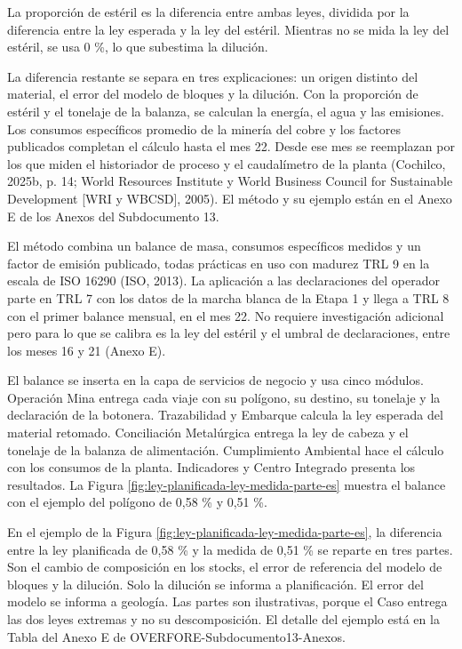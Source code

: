 \documentclass[subdoc]{../../comun/overfore}
\begin{document}
La proporción de estéril es la diferencia entre ambas leyes, dividida por la diferencia entre la ley esperada y la ley del estéril. Mientras no se mida la ley del estéril, se usa 0 \%, lo que subestima la dilución.

La diferencia restante se separa en tres explicaciones: un origen distinto del material, el error del modelo de bloques y la dilución. Con la proporción de estéril y el tonelaje de la balanza, se calculan la energía, el agua y las emisiones. Los consumos específicos promedio de la minería del cobre y los factores publicados completan el cálculo hasta el mes 22. Desde ese mes se reemplazan por los que miden el historiador de proceso y el caudalímetro de la planta (Cochilco, 2025b, p. 14; World Resources Institute y World Business Council for Sustainable Development [WRI y WBCSD], 2005). El método y su ejemplo están en el Anexo E de los Anexos del Subdocumento 13.

El método combina un balance de masa, consumos específicos medidos y un factor de emisión publicado, todas prácticas en uso con madurez TRL 9 en la escala de ISO 16290 (ISO, 2013). La aplicación a las declaraciones del operador parte en TRL 7 con los datos de la marcha blanca de la Etapa 1 y llega a TRL 8 con el primer balance mensual, en el mes 22. No requiere investigación adicional pero para lo que se calibra es la ley del estéril y el umbral de declaraciones, entre los meses 16 y 21 (Anexo E).

El balance se inserta en la capa de servicios de negocio y usa cinco módulos. Operación Mina entrega cada viaje con su polígono, su destino, su tonelaje y la declaración de la botonera. Trazabilidad y Embarque calcula la ley esperada del material retomado. Conciliación Metalúrgica entrega la ley de cabeza y el tonelaje de la balanza de alimentación. Cumplimiento Ambiental hace el cálculo con los consumos de la planta. Indicadores y Centro Integrado presenta los resultados. La Figura \ref{fig:ley-planificada-ley-medida-parte-es} muestra el balance con el ejemplo del polígono de 0,58 \% y 0,51 \%.

En el ejemplo de la Figura \ref{fig:ley-planificada-ley-medida-parte-es}, la diferencia entre la ley planificada de 0,58 \% y la medida de 0,51 \% se reparte en tres partes. Son el cambio de composición en los stocks, el error de referencia del modelo de bloques y la dilución. Solo la dilución se informa a planificación. El error del modelo se informa a geología. Las partes son ilustrativas, porque el Caso entrega las dos leyes extremas y no su descomposición. El detalle del ejemplo está en la Tabla  del Anexo E de OVERFORE-Subdocumento13-Anexos.
\end{document}
